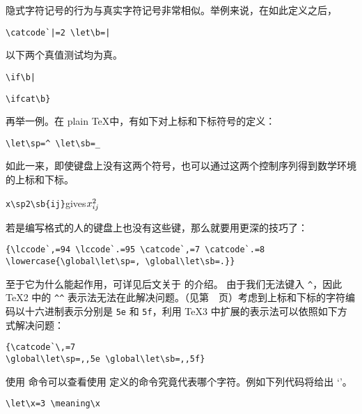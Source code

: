\documentclass{book}
\begin{document}
隐式字符记号的行为与真实字符记号非常相似。举例来说，在如此定义之后，
\begin{verbatim}
\catcode`|=2 \let\b=|
\end{verbatim}
以下两个真值测试均为真。
\begin{verbatim}
\if\b|
\end{verbatim}
\begin{verbatim}
\ifcat\b}
\end{verbatim}

再举一例。在 plain \TeX 中，有如下对上标和下标符号的定义：
\begin{verbatim}
\let\sp=^ \let\sb=_
\end{verbatim}
如此一来，即使键盘上没有这两个符号，也可以通过这两个控制序列得到数学环境的上标和下标。
\begin{disp}\verb>x\sp2\sb{ij}>\quad gives\quad $x\sp2\sb{ij}$\end{disp}
若是编写格式的人的键盘上也没有这些键，那么就要用更深的技巧了：\label{spsb:truc}
\begin{verbatim}
{\lccode`,=94 \lccode`.=95 \catcode`,=7 \catcode`.=8
\lowercase{\global\let\sp=, \global\let\sb=.}}
\end{verbatim}
至于它为什么能起作用，可详见后文关于  的介绍。
由于我们无法键入 \verb.^.，因此 \TeX2 中的 \verb.^^. 表示法无法在此解决问题。（见第~\pageref{hathat}~页）考虑到上标和下标的字符编码以十六进制表示分别是 \verb.5e. 和 \verb.5f.，利用 \TeX3 中扩展的表示法可以依照如下方式解决问题：
\begin{verbatim}
{\catcode`\,=7
\global\let\sp=,,5e \global\let\sb=,,5f}
\end{verbatim}

使用  命令可以查看使用  定义的命令究竟代表哪个字符。例如下列代码将给出 `'。
\begin{verbatim}
\let\x=3 \meaning\x
\end{verbatim}
\end{document}
